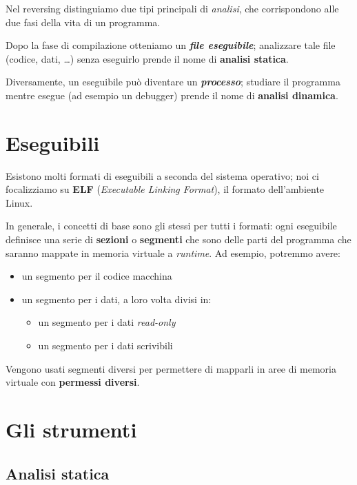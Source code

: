 Nel reversing distinguiamo due tipi principali di \textit{analisi}, che corrispondono alle due fasi della vita di un programma.

Dopo la fase di compilazione otteniamo un \textbf{\textit{file eseguibile}}; analizzare tale file (codice, dati, \dots) senza eseguirlo 
prende il nome di \textbf{analisi statica}.

Diversamente, un eseguibile può diventare un \textbf{\textit{processo}}; studiare il programma
mentre esegue (ad esempio un debugger) prende il nome di \textbf{analisi dinamica}.

\section{Eseguibili}

Esistono molti formati di eseguibili a seconda del sistema operativo; noi ci 
focalizziamo su \textbf{ELF} (\textit{Executable Linking Format}), il formato dell'ambiente Linux.

In generale, i concetti di base sono gli stessi per tutti i formati: ogni eseguibile definisce una serie
di \textbf{sezioni} o \textbf{segmenti} che sono delle parti del programma che saranno mappate in memoria
virtuale a \textit{runtime}. Ad esempio, potremmo avere:
\begin{itemize}
    \item un segmento per il codice macchina
    \item un segmento per i dati, a loro volta divisi in:
    \begin{itemize}
        \item un segmento per i dati \textit{read-only}
        \item un segmento per i dati scrivibili
    \end{itemize}
\end{itemize}
Vengono usati segmenti diversi per permettere di mapparli in aree di memoria virtuale
con \textbf{permessi diversi}.

\section{Gli strumenti}

\subsection{Analisi statica}

